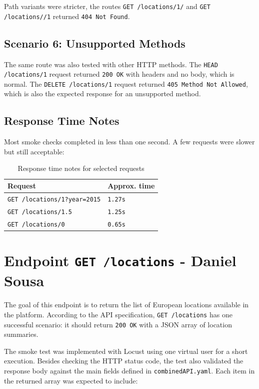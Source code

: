 Path variants were stricter, the routes \texttt{GET /locations/1/} and \texttt{GET /locations//1} returned \texttt{404 Not Found}.

\subsection{Scenario 6: Unsupported Methods}

The same route was also tested with other HTTP methods. The \texttt{HEAD /locations/1} request returned \texttt{200 OK} with headers and no body, which is normal. The \texttt{DELETE /locations/1} request returned \texttt{405 Method Not Allowed}, which is also the expected response for an unsupported method.

\newpage 

\subsection{Response Time Notes}

Most smoke checks completed in less than one second. A few requests were slower but still acceptable:
\begin{table}[H]
    \centering
    \caption{Response time notes for selected requests}
    \begin{tabular}{p{} p{}}
    \hline
    \textbf{Request} & \textbf{Approx. time} \\\hline
    \texttt{GET /locations/1?year=2015} & \texttt{1.27s} \\
    \texttt{GET /locations/1.5} & \texttt{1.25s} \\
    \texttt{GET /locations/0} & \texttt{0.65s} \\\hline
    \end{tabular}
\end{table}

\section{Endpoint \texttt{GET /locations} - Daniel Sousa}

The goal of this endpoint is to return the list of European locations available in the platform. According to the API specification, \texttt{GET /locations} has one successful scenario: it should return \texttt{200 OK} with a JSON array of location summaries.

The smoke test was implemented with Locust using one virtual user for a short execution. Besides checking the HTTP status code, the test also validated the response body against the main fields defined in \texttt{combinedAPI.yaml}. Each item in the returned array was expected to include:


